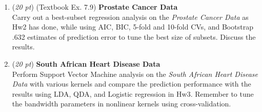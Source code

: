 \documentclass[10pt]{article}
\theoremstyle{definition}
\theoremstyle{remark}
\begin{document}
\begin{enumerate}
	\item (\textit{20 pt}) (Textbook Ex. 7.9) \textbf{Prostate Cancer Data}\\
	Carry out a best-subset regression analysis on the \textit{Prostate Cancer Data} as Hw2 has done, while using AIC, BIC, 5-fold and 10-fold CVs, and Bootstrap .632 estimates of prediction error to tune the best size of subsets. Discuss the results.
	\item (\textit{20 pt}) \textbf{South African Heart Disease Data} \\
	Perform Support Vector Machine analysis on the \textit{South African Heart Disease Data} with various kernels and compare the prediction performance with the results using LDA, QDA, and Logistic regression in Hw3. Remember to tune the bandwidth parameters in nonlinear kernels using cross-validation.
\end{enumerate}



\end{document}
